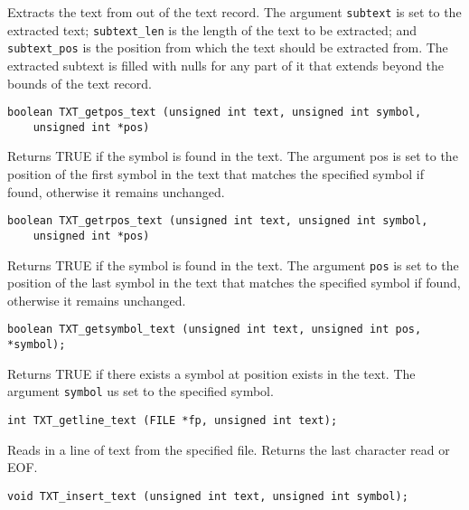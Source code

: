 \documentclass[11pt]{article}
\begin{document}
{\vspace{-0.2cm}
Extracts the text from out of the text record. The argument \verb|subtext| is set to the extracted text;
\verb|subtext_len| is the length of the text to be extracted; and \verb|subtext_pos| is the position from which the text
should be extracted from. The extracted subtext is filled with nulls for any part of it that extends
beyond the bounds of the text record.

\begin{verbatim}
boolean TXT_getpos_text (unsigned int text, unsigned int symbol,
    unsigned int *pos)
\end{verbatim}

\vspace{-0.2cm}
Returns TRUE if the symbol is found in the text. The argument pos is set to the
position of the first symbol in the text that matches the specified symbol if
found, otherwise it remains unchanged.

\begin{verbatim}
boolean TXT_getrpos_text (unsigned int text, unsigned int symbol,
    unsigned int *pos)
\end{verbatim}

\vspace{-0.2cm}
Returns TRUE if the symbol is found in the text. The argument \verb|pos| is set to the
position of the last symbol in the text that matches the specified symbol if
found, otherwise it remains unchanged.

\begin{verbatim}
boolean TXT_getsymbol_text (unsigned int text, unsigned int pos, *symbol);
\end{verbatim}

\vspace{-0.2cm}
Returns TRUE if there exists a symbol at position exists in the text. 
The argument \verb|symbol| us set to the specified symbol.

\begin{verbatim}
int TXT_getline_text (FILE *fp, unsigned int text);
\end{verbatim}

\vspace{-0.2cm}
Reads in a line of text from the specified file. Returns the last character
read or EOF.

\begin{verbatim}
void TXT_insert_text (unsigned int text, unsigned int symbol);
\end{verbatim}

}
\end{document}
